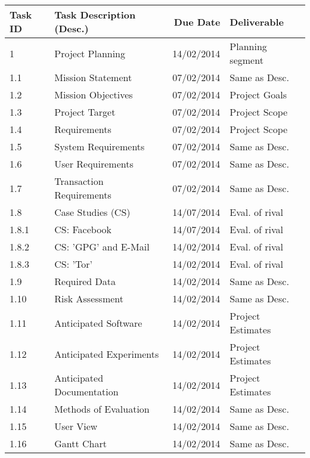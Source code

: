 \begin{tabular}{llrl}

    \toprule
    
    Task ID  & Task Description (Desc.)     & Due Date    & Deliverable       \\
    
    \midrule
    
    1        & Project Planning             & 14/02/2014  & Planning segment  \\
    1.1      & Mission Statement            & 07/02/2014  & Same as Desc.     \\
    1.2      & Mission Objectives           & 07/02/2014  & Project Goals     \\
    1.3      & Project Target               & 07/02/2014  & Project Scope     \\
    1.4      & Requirements                 & 07/02/2014  & Project Scope     \\
    1.5      & System Requirements          & 07/02/2014  & Same as Desc.     \\
    1.6      & User Requirements            & 07/02/2014  & Same as Desc.     \\
    1.7      & Transaction Requirements     & 07/02/2014  & Same as Desc.     \\
    
    \cmidrule(r){2-3}
    1.8      & Case Studies (CS)            & 14/07/2014  & Eval. of rival    \\
    1.8.1    & CS: Facebook                 & 14/07/2014  & Eval. of rival    \\
    1.8.2    & CS: 'GPG' and E-Mail         & 14/02/2014  & Eval. of rival    \\
    1.8.3    & CS: 'Tor'                    & 14/02/2014  & Eval. of rival    \\
    \cmidrule(r){2-3}
    
    1.9      & Required Data                & 14/02/2014  & Same as Desc.     \\
    1.10     & Risk Assessment              & 14/02/2014  & Same as Desc.     \\
    1.11     & Anticipated Software         & 14/02/2014  & Project Estimates \\
    1.12     & Anticipated Experiments      & 14/02/2014  & Project Estimates \\
    1.13     & Anticipated Documentation    & 14/02/2014  & Project Estimates \\
    1.14     & Methods of Evaluation        & 14/02/2014  & Same as Desc.     \\
    1.15     & User View                    & 14/02/2014  & Same as Desc.     \\
    1.16     & Gantt Chart                  & 14/02/2014  & Same as Desc.     \\
    
    \bottomrule
    
\end{tabular}

